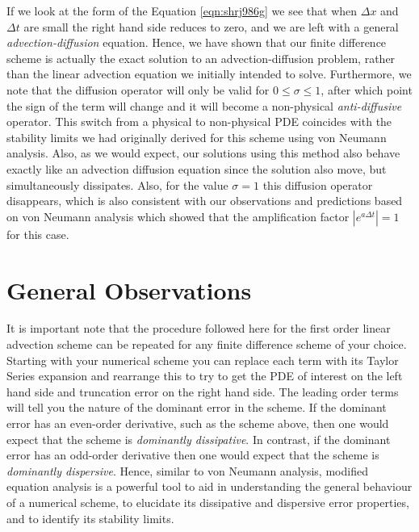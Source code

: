 If we look at the form of the Equation \ref{eqn:shrj986g} we see that when $\Delta x$ and $\Delta t$ are small the right hand side reduces to zero, and we are left with a general {\it advection-diffusion} equation. Hence, we have shown that our finite difference scheme is actually the exact solution to an advection-diffusion problem, rather than the linear advection equation we initially intended to solve. Furthermore, we note that the diffusion operator will only be valid for $0 \leq \sigma \leq 1$, after which point the sign of the term will change and it will become a non-physical {\it anti-diffusive} operator. This switch from a physical to non-physical PDE coincides with the stability limits we had originally derived for this scheme using von Neumann analysis. Also, as we would expect, our solutions using this method also behave exactly like an advection diffusion equation since the solution also move, but simultaneously dissipates. Also, for the value $\sigma=1$ this diffusion operator disappears, which is also consistent with our observations and predictions based on von Neumann analysis which showed that the amplification factor $| e^{a \Delta t} | = 1$ for this case.

\section{General Observations}
It is important note that the procedure followed here for the first order linear advection scheme can be repeated for any finite difference scheme of your choice. Starting with your numerical scheme you can replace each term with its Taylor Series expansion and rearrange this to try to get the PDE of interest on the left hand side and truncation error on the right hand side. The leading order terms will tell you the nature of the dominant error in the scheme. If the dominant error has an even-order derivative, such as the scheme above, then one would expect that the scheme is {\it dominantly dissipative}. In contrast, if the dominant error has an odd-order derivative then one would expect that the scheme is {\it dominantly dispersive}. Hence, similar to von Neumann analysis, modified equation analysis is a powerful tool to aid in understanding the general behaviour of a numerical scheme, to elucidate its dissipative and dispersive error properties, and to identify its stability limits.

